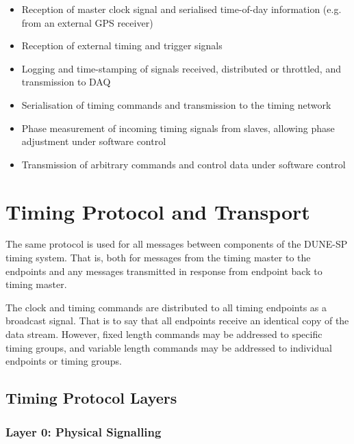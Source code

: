 \documentclass{dune}
\begin{document}
\begin{itemize}
	\item Reception of master clock signal and serialised time-of-day information (e.g. from an external GPS receiver)
	\item Reception of external timing and trigger signals
	\item Logging and time-stamping of signals received, distributed or throttled, and transmission to DAQ
	\item Serialisation of timing commands and transmission to the timing network
	\item Phase measurement of incoming timing signals from slaves, allowing phase adjustment under software control
	\item Transmission of arbitrary commands and control data under software control
\end{itemize}

%



\section{Timing Protocol and Transport}

The same protocol is used for all messages between components of the DUNE-SP timing system. That is, both for messages from the timing master to the endpoints and any messages transmitted in response from endpoint back to timing master.

The clock and timing commands are distributed to all timing endpoints as a broadcast signal. That is to say that all endpoints receive an identical copy of the data stream. However, fixed length commands may be addressed to specific timing groups, and variable length commands may be addressed to individual endpoints or timing groups.


\subsection{Timing Protocol Layers}

\subsubsection{Layer 0: Physical Signalling}
\end{document}
